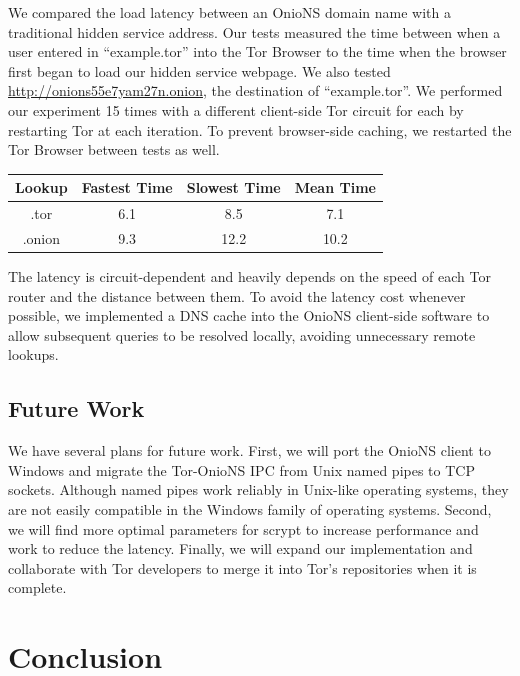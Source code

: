 \documentclass{sig-alternate}
\begin{document}
We compared the load latency between an OnioNS domain name with a traditional hidden service address. Our tests measured the time between when a user entered in ``example.tor'' into the Tor Browser to the time when the browser first began to load our hidden service webpage. We also tested \url{http://onions55e7yam27n.onion}, the destination of ``example.tor''. We performed our experiment 15 times with a different client-side Tor circuit for each by restarting Tor at each iteration. To prevent browser-side caching, we restarted the Tor Browser between tests as well. 

\renewcommand{\arraystretch}{1}
\begin{center}
    \begin{tabular}{ | c | c | c | c |}
    \hline
    \textbf{Lookup} & \textbf{Fastest Time} & \textbf{Slowest Time} & \textbf{Mean Time} \\
    \hline
    .tor & 6.1 & 8.5 & 7.1 \\ \hline
	.onion & 9.3 & 12.2 & 10.2 \\
	\hline
    \end{tabular}
\end{center}

The latency is circuit-dependent and heavily depends on the speed of each Tor router and the distance between them. To avoid the latency cost whenever possible, we implemented a DNS cache into the OnioNS client-side software to allow subsequent queries to be resolved locally, avoiding unnecessary remote lookups.

\subsection{Future Work}

We have several plans for future work. First, we will port the OnioNS client to Windows and migrate the Tor-OnioNS IPC from Unix named pipes to TCP sockets. Although named pipes work reliably in Unix-like operating systems, they are not easily compatible in the Windows family of operating systems. Second, we will find more optimal parameters for scrypt to increase performance and work to reduce the latency. Finally, we will expand our implementation and collaborate with Tor developers to merge it into Tor's repositories when it is complete.

\section{Conclusion}
\end{document}
